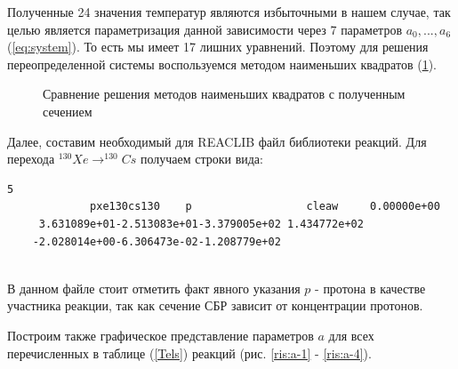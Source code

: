 \documentclass[%
master,    %
natbib,      %
subf,        %
href,        %
colorlinks,  %
]{disser}
\begin{document}
Полученные 24 значения температур являются избыточными в нашем случае, так целью является параметризация данной зависимости через 7 параметров $a_0, ..., a_6$ (\ref{eq:system}). То есть мы имеет 17 лишних уравнений. Поэтому для решения переопределенной системы воспользуемся методом наименьших квадратов (\ref{ris:2}).

\begin{figure}[h]
	\caption{Сравнение решения методов наименьших квадратов с полученным сечением}
	\label{ris:2}
\end{figure}

Далее, составим необходимый для REACLIB файл библиотеки реакций. Для перехода $^{130}Xe \to ^{130}Cs$ получаем строки вида: 

\begin{lstlisting}[label={lst:label}]
	5
	         pxe130cs130    p                  cleaw     0.00000e+00          
	 3.631089e+01-2.513083e+01-3.379005e+02 1.434772e+02                      
	-2.028014e+00-6.306473e-02-1.208779e+02                                   
	
\end{lstlisting}

В данном файле стоит отметить факт явного указания $p$ - протона в качестве участника реакции, так как сечение СБР зависит от концентрации протонов. 

Построим также графическое представление параметров $a$ для всех перечисленных в таблице (\ref{Tels}) реакций  (рис. \ref{ris:a-1} - \ref{ris:a-4}).
\end{document}
